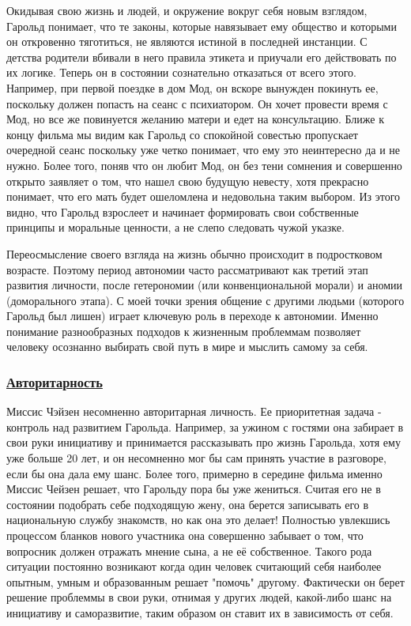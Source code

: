 \documentclass[a4paper,12pt]{report} %
\begin{document}
Окидывая свою жизнь и людей, и окружение вокруг себя новым взглядом, Гарольд понимает, что те законы, которые навязывает ему общество и которыми он откровенно тяготиться, не являются истиной в последней инстанции. С детства родители вбивали в него правила этикета и приучали его действовать по их логике. Теперь он в состоянии сознательно отказаться от всего этого. Например, при первой поездке в дом Мод, он вскоре вынужден покинуть ее, поскольку должен попасть на сеанс с психиатором. Он хочет провести время с Мод, но все же повинуется желанию матери и едет на консультацию. Ближе к концу фильма мы видим как Гарольд со спокойной совестью пропускает очередной сеанс поскольку уже четко понимает, что ему это неинтересно да и не нужно. Более того, поняв что он любит Мод, он без тени сомнения и совершенно открыто заявляет о том, что нашел свою будущую невесту, хотя прекрасно понимает, что его мать будет ошеломлена и недовольна таким выбором. Из этого видно, что Гарольд взрослеет и начинает формировать свои собственные принципы и моральные ценности, а не слепо следовать чужой указке. 

Переосмысление своего взгляда на жизнь обычно происходит в подростковом возрасте. Поэтому период автономии часто рассматривают как третий этап развития личности, после гетерономии (или конвенциональной морали) и аномии (доморального этапа). С моей точки зрения общение с другими людьми (которого Гарольд был лишен) играет ключевую роль в переходе к автономии. Именно понимание разнообразных подходов к жизненным проблеммам позволяет человеку осознанно выбирать свой путь в мире и мыслить самому за себя.


\subsubsection{\underline{Авторитарность}}

Миссис Чэйзен несомненно авторитарная личность. Ее приоритетная задача - контроль над развитием Гарольда. Например, за ужином с гостями она забирает в свои руки инициативу и принимается рассказывать про жизнь Гарольда, хотя ему уже больше 20 лет, и он несомненно мог бы сам принять участие в разговоре, если бы она дала ему шанс. Более того, примерно в середине фильма  именно Миссис Чейзен решает, что Гарольду пора бы уже жениться. Считая его не в состоянии подобрать себе подходящую жену, она берется записывать его в национальную службу знакомств, но как она это делает! Полностью увлекшись процессом бланков нового участника она совершенно забывает о том, что вопросник должен отражать мнение сына, а не её собственное. Такого рода ситуации постоянно возникают когда один человек считающий себя наиболее опытным, умным и образованным решает "помочь" другому. Фактически он берет решение проблеммы в свои руки, отнимая у других людей, какой-либо шанс на инициативу и саморазвитие, таким образом он ставит их в зависимость от себя.
\end{document}
